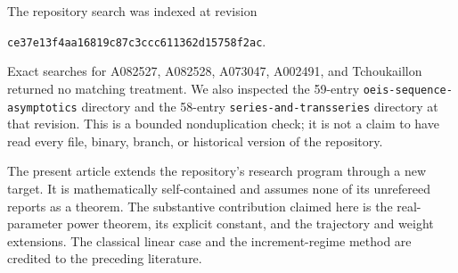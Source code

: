 The repository search was indexed at revision
\begin{center}
\small\texttt{ce37e13f4aa16819c87c3ccc611362d15758f2ac}.
\end{center}
Exact searches for A082527, A082528, A073047, A002491, and Tchoukaillon
returned no matching treatment. We also inspected the 59-entry
\texttt{oeis-sequence-asymptotics} directory and the 58-entry
\texttt{series-and-transseries} directory at that revision. This is a
bounded nonduplication check; it is not a claim to have read every file,
binary, branch, or historical version of the repository.

The present article extends the repository's research program through a
new target. It is mathematically self-contained and assumes none of its
unrefereed reports as a theorem. The substantive contribution claimed
here is the real-parameter power theorem, its explicit constant, and the
trajectory and weight extensions. The classical linear case and the
increment-regime method are credited to the preceding literature.

